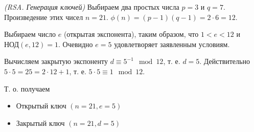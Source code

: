 \begin{example}
\emph{(RSA. Генерация ключей)}
Выбираем два простых числа  $p = 3$ и $q = 7$. Произведение этих чисел $n = 21$. 
\(
\phi\left(n\right)=\left(p - 1 \right)\left(q - 1 \right) = 2 \cdot 6 = 12
\). 

Выбираем число $e$  (открытая экспонента), таким образом, что $1 < e < 12$ и  
$\mbox{НОД}\left( e, 12 \right) = 1$. Очевидно $e = 5$ удовлетворяет заявленным условиям. 

Вычисляем закрытую экспоненту $d \equiv 5^{-1} \mod{12}$, т. е. $d = 5$. 
Действительно $5 \cdot 5 = 25 = 2 \cdot 12 + 1$, т. е. $5 \cdot 5 \equiv 1 \mod{12}$.

Т. о. получаем
\begin{itemize}
\item Открытый ключ $\left(n=21, e=5\right)$
\item Закрытый ключ $\left(n=21, d=5\right)$
\end{itemize}
\label{exAddRSAKeyGen}
\end{example}

